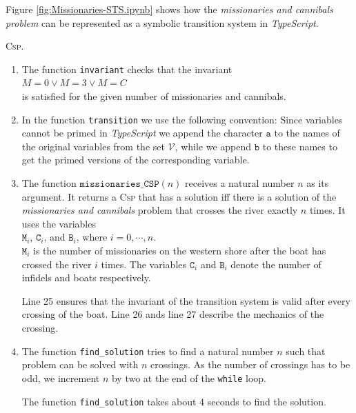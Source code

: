 Figure \ref{fig:Missionaries-STS.ipynb} shows how the \emph{missionaries and cannibals problem} can be
represented as a symbolic transition system in \textsl{TypeScript}.


\textsc{Csp}.
\begin{enumerate}
\item The function \texttt{invariant} checks that the invariant
      \\[0.2cm]
      \hspace*{1.3cm}
      $M = 0 \vee M = 3 \vee M = C$
      \\[0.2cm]
      is satisfied for the given number of missionaries and cannibals.
\item In the function \texttt{transition} 
      we use the following convention: Since variables cannot be primed in
      \textsl{TypeScript} we append the character $\mathtt{a}$ to the names of the original
      variables from the set $\mathcal{V}$, while we append $\mathtt{b}$ to these names to get the primed versions of the
      corresponding variable.
\item The function $\mathtt{missionaries\_CSP}(n)$ receives a natural number $n$ as its argument.
       It returns a \textsc{Csp} that has a solution iff there is a solution of the \emph{missionaries and cannibals}
       problem that crosses the river exactly $n$ times.  It uses the variables
       \\[0.2cm]
       \hspace*{1.3cm}
       $\mathtt{M}_i$, $\mathtt{C}_i$, and $\mathtt{B}_i$, where $i=0,\cdots,n$.
       \\[0.2cm]
       $\mathtt{M}_i$ is the number of missionaries on the western shore after the boat has crossed the river
       $i$ times. The variables $\mathtt{C}_i$ and $\texttt{B}_i$ denote the number of infidels and boats
       respectively.

       Line 25 ensures that the invariant of the transition system is valid after every crossing of the boat.
       Line 26 ands line 27 describe the mechanics of the crossing.
\item The function \texttt{find\_solution} tries to find a natural number $n$ such that problem can be solved
       with $n$ crossings. As the number of crossings has to be odd, we increment $n$ by
       two at the end of the \texttt{while} loop.

       The function \texttt{find\_solution} takes about 4 seconds to find the solution.
\end{enumerate}

